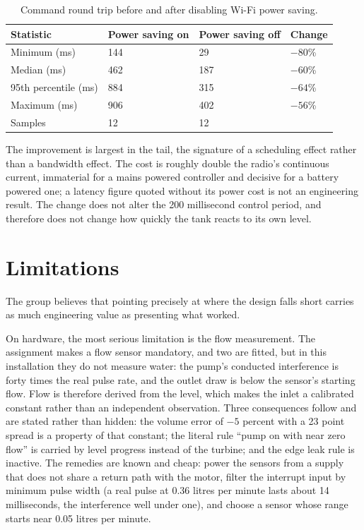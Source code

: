 \begin{table}[H]
\caption{Command round trip before and after disabling Wi-Fi power saving.}
\label{tab:e9}
\centering
\renewcommand{\arraystretch}{1.05}
\begin{tabular}{|p{5.0cm}|p{2.6cm}|p{2.6cm}|p{2.0cm}|}
\hline
\rowcolor[HTML]{B7E1F0}
\textbf{Statistic} & \textbf{Power saving on} & \textbf{Power saving off} & \textbf{Change} \\
\hline
Minimum (ms)          & 144 & 29  & $-80$\% \\ \hline
Median (ms)           & 462 & 187 & $-60$\% \\ \hline
95th percentile (ms)  & 884 & 315 & $-64$\% \\ \hline
Maximum (ms)          & 906 & 402 & $-56$\% \\ \hline
Samples               & 12  & 12  & \\ \hline
\end{tabular}
\end{table}

The improvement is largest in the tail, the signature of a scheduling effect rather than a bandwidth effect. The cost is roughly double the radio's continuous current, immaterial for a mains powered controller and decisive for a battery powered one; a latency figure quoted without its power cost is not an engineering result. The change does not alter the 200 millisecond control period, and therefore does not change how quickly the tank reacts to its own level.

\section{Limitations}

The group believes that pointing precisely at where the design falls short carries as much engineering value as presenting what worked.

On hardware, the most serious limitation is the flow measurement. The assignment makes a flow sensor mandatory, and two are fitted, but in this installation they do not measure water: the pump's conducted interference is forty times the real pulse rate, and the outlet draw is below the sensor's starting flow. Flow is therefore derived from the level, which makes the inlet a calibrated constant rather than an independent observation. Three consequences follow and are stated rather than hidden: the volume error of $-5$ percent with a 23 point spread is a property of that constant; the literal rule ``pump on with near zero flow'' is carried by level progress instead of the turbine; and the edge leak rule is inactive. The remedies are known and cheap: power the sensors from a supply that does not share a return path with the motor, filter the interrupt input by minimum pulse width (a real pulse at 0.36 litres per minute lasts about 14 milliseconds, the interference well under one), and choose a sensor whose range starts near 0.05 litres per minute.

